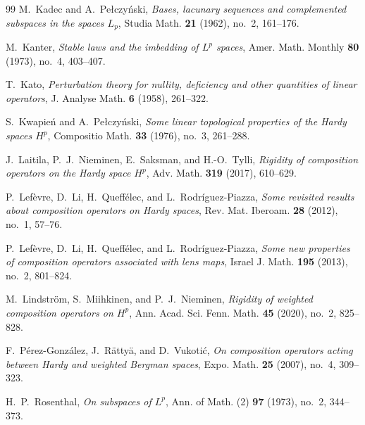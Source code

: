 \documentclass[11pt, reqno]{amsart}
\theoremstyle{definition}
\theoremstyle{remark}
\begin{document}
\begin{thebibliography}{99}
M.~Kadec and A.~Pe{\l}czy\'nski,
\textit{Bases, lacunary sequences and complemented subspaces in the
spaces \(L_p\)},
Studia Math. \textbf{21} (1962), no.~2, 161--176.

M.~Kanter,
\textit{Stable laws and the imbedding of \(L^p\) spaces},
Amer. Math. Monthly \textbf{80} (1973), no.~4, 403--407.

T.~Kato,
\textit{Perturbation theory for nullity, deficiency and other quantities
of linear operators},
J. Analyse Math. \textbf{6} (1958), 261--322.

S.~Kwapie\'n and A.~Pe{\l}czy\'nski,
\textit{Some linear topological properties of the Hardy spaces \(H^p\)},
Compositio Math. \textbf{33} (1976), no.~3, 261--288.

J.~Laitila, P.~J.~Nieminen, E.~Saksman, and H.-O.~Tylli,
\textit{Rigidity of composition operators on the Hardy space \(H^p\)},
Adv. Math. \textbf{319} (2017), 610--629.

P.~Lef\`evre, D.~Li, H.~Queff\'elec, and L.~Rodr\'iguez-Piazza,
\textit{Some revisited results about composition operators on Hardy
spaces},
Rev. Mat. Iberoam. \textbf{28} (2012), no.~1, 57--76.

P.~Lef\`evre, D.~Li, H.~Queff\'elec, and L.~Rodr\'iguez-Piazza,
\textit{Some new properties of composition operators associated with
lens maps},
Israel J. Math. \textbf{195} (2013), no.~2, 801--824.

M.~Lindstr\"om, S.~Miihkinen, and P.~J.~Nieminen,
\textit{Rigidity of weighted composition operators on \(H^p\)},
Ann. Acad. Sci. Fenn. Math. \textbf{45} (2020), no.~2, 825--828.


F.~P\'erez-Gonz\'alez, J.~R\"atty\"a, and D.~Vukoti\'c,
\textit{On composition operators acting between Hardy and weighted
Bergman spaces},
Expo. Math. \textbf{25} (2007), no.~4, 309--323.

H.~P.~Rosenthal,
\textit{On subspaces of \(L^p\)},
Ann. of Math. (2) \textbf{97} (1973), no.~2, 344--373.


\end{thebibliography}
\end{document}
